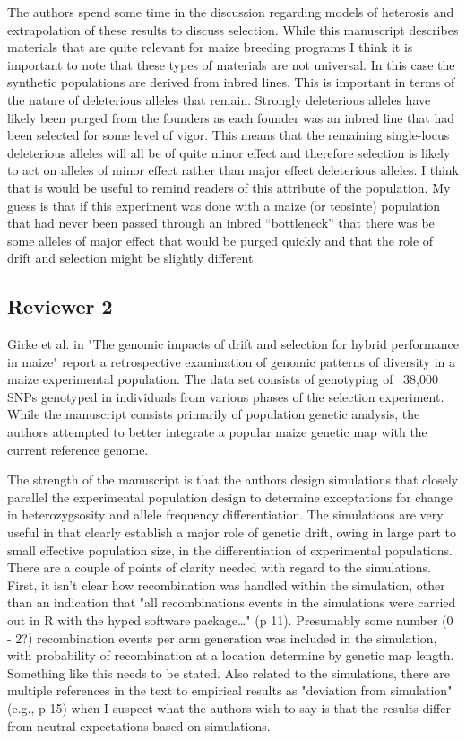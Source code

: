 \documentclass[onecolumn,oneside,letterpaper]{article}
\begin{document}
{

The authors spend some time in the discussion regarding models of heterosis and 
extrapolation of these results to discuss selection.  While this manuscript 
describes materials that are quite relevant for maize breeding programs I think 
it is important to note that these types of materials are not universal.  In 
this case the synthetic populations are derived from inbred lines.  This is 
important in terms of the nature of deleterious alleles that remain.  Strongly 
deleterious alleles have likely been purged from the founders as each founder 
was an inbred line that had been selected for some level of vigor.  This means 
that the remaining single-locus deleterious alleles will all be of quite minor 
effect and therefore selection is likely to act on alleles of minor effect 
rather than major effect deleterious alleles.  I think that is would be useful 
to remind readers of this attribute of the population.  My guess is that if this 
experiment was done with a maize (or teosinte) population that had never been 
passed through an inbred “bottleneck” that there was be some alleles of major 
effect that would be purged quickly and that the role of drift and selection 
might be slightly different.


\subsection*{Reviewer 2}
Girke et al. in "The genomic impacts of drift and selection for hybrid performance in maize" report a retrospective examination of genomic patterns of diversity in a maize experimental population. The data 
set consists of genotyping of ~38,000 SNPs genotyped in individuals from various phases of the selection 
experiment. While the manuscript consists primarily of population genetic analysis, the authors attempted 
to better integrate a popular maize genetic map with the current reference genome.

The strength of the manuscript is that the authors design simulations that closely parallel the experimental 
population design to determine exceptations for change in heterozygsosity and allele frequency 
differentiation. The simulations are very useful in that clearly establish a major role of genetic drift, owing 
in large part to small effective population size, in the differentiation of experimental populations. There are 
a couple of points of clarity needed with regard to the simulations. First, it isn't clear how recombination 
was handled within the simulation, other than an indication that "all recombinations events in the 
simulations were carried out in R with the hyped software package…" (p 11). Presumably some number (0 - 
2?) recombination events per arm generation was included in the simulation, with probability of 
recombination at a location determine by genetic map length. Something like this needs to be stated. Also 
related to the simulations, there are multiple references in the text to empirical results as "deviation from 
simulation" (e.g., p 15) when I suspect what the authors wish to say is that the results differ from neutral 
expectations based on simulations.

}
\end{document}
